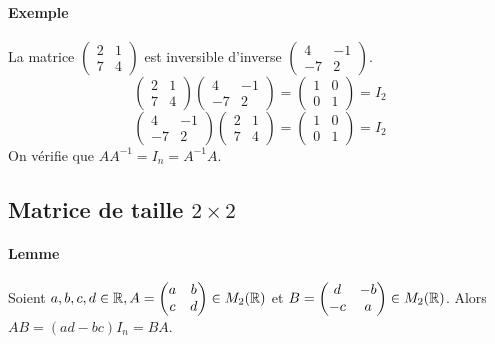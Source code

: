\paragraph{Exemple} La matrice $\begin{pmatrix} 2 & 1 \\ 7 & 4 \end{pmatrix}$ est inversible d'inverse $\begin{pmatrix} 4 & -1 \\ -7 & 2 \end{pmatrix}$.
$$\begin{pmatrix}2 & 1 \\ 7 & 4 \end{pmatrix} 
  \begin{pmatrix} 4 & -1 \\ -7 & 2 \end{pmatrix} 
  = \begin{pmatrix} 1 & 0 \\ 0 & 1 \end{pmatrix} = I_2$$
$$\begin{pmatrix} 4 & -1 \\ -7 & 2 \end{pmatrix} 
  \begin{pmatrix}2 & 1 \\ 7 & 4 \end{pmatrix}  
  = \begin{pmatrix} 1 & 0 \\ 0 & 1 \end{pmatrix} = I_2$$
On vérifie que $A A^{-1} = I_n = A^{-1} A$.

%
\subsection{Matrice de taille $2\times 2$}
%
\paragraph{Lemme} Soient $a, b, c, d \in \mathbb{R}, A = \begin{pmatrix} a & b \\ c & d \end{pmatrix} \in M_{2}(\mathbb{R})$ et $B = \begin{pmatrix} d & -b \\ -c & a \end{pmatrix} \in M_{2}(\mathbb{R})$. Alors $A B = (a d - b c) I_n = B A$.

